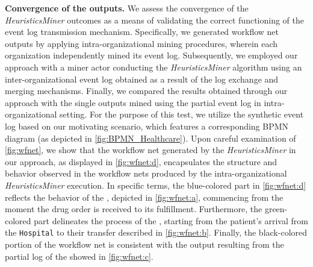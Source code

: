 \textbf{Convergence of the outputs.}
\label{sec:discussion:subsec:convergence}
We assess the convergence of the \textit{HeuristicsMiner} outcomes as a means of validating the correct functioning of the event log transmission mechanism. Specifically, we generated workflow net outputs by applying intra-organizational mining procedures, wherein each organization independently mined its event log. Subsequently, we employed our approach with a miner actor conducting the \textit{HeuristicsMiner} algorithm using an inter-organizational event log obtained as a result of the log exchange and merging mechanisms. Finally, we compared the results obtained through our approach with the single outputs mined using the partial event log in intra-organizational setting.  For the purpose of this test, we utilize the synthetic event log based on our motivating scenario, which features a corresponding BPMN diagram (as depicted in \cref{fig:BPMN_Healthcare}). Upon careful examination of \cref{fig:wfnet}, we show that the workflow net generated by the \textit{HeuristicsMiner} in our approach, as displayed in \cref{fig:wfnet:d}, encapsulates the structure and behavior observed in the workflow nets produced by the intra-organizational \textit{HeuristicsMiner} execution. In specific terms, the blue-colored part in \cref{fig:wfnet:d} reflects the behavior of the , depicted in \cref{fig:wfnet:a}, commencing from the moment the drug order is received to its fulfillment. Furthermore, the green-colored part delineates the process of the , starting from the patient's arrival from the \texttt{Hospital} to their transfer described in \cref{fig:wfnet:b}. Finally, the black-colored portion of the workflow net is consistent with the output resulting from the partial log of the  showed in \cref{fig:wfnet:c}.

